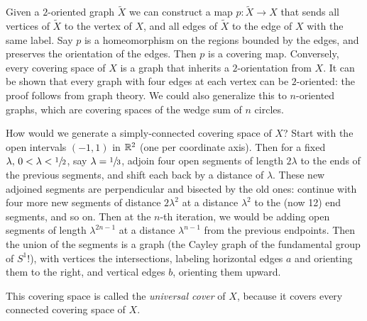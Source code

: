 Given a $2$-oriented graph $\widetilde X$ we can construct a map $p \colon \widetilde X \to X$ that sends all vertices of $\widetilde X$ to the vertex of $X$, and all edges of $\widetilde X$ to the edge of $X$ with the same label. Say $p$ is a homeomorphism on the regions bounded by the edges, and preserves the orientation of the edges. Then $p$ is a covering map. Conversely, every covering space of $X$ is a graph that inherits a $2$-orientation from $X$. It can be shown that every graph with four edges at each vertex can be $2$-oriented: the proof follows from graph theory. We could also generalize this to $n$-oriented graphs, which are covering spaces of the wedge sum of $n$ circles.

How would we generate a simply-connected covering space of $X$? Start with the open intervals $(-1,1)$ in $\mathbb{R}^2$ (one per coordinate axis). Then for a fixed $\lambda,\,0<\lambda < \sfrac{1}{2}$, say $\lambda =\sfrac{1}{3}$, adjoin four open segments of length $2\lambda$ to the ends of the previous segments, and shift each back by a distance of $\lambda$. These new adjoined segments are perpendicular and bisected by the old ones: continue with four more new segments of distance $2\lambda^2$ at a distance $\lambda^2$ to the (now 12) end segments, and so on. Then at the $n$-th iteration, we would be adding open segments of length $\lambda^{2n-1}$ at a distance $\lambda^{n-1}$ from the previous endpoints. Then the union of the segments is a graph (the Cayley graph of the fundamental group of $S^{1} $!), with vertices the intersections, labeling horizontal edges $a$ and orienting them to the right, and vertical edges $b$, orienting them upward.

This covering space is called the \emph{universal cover} of $X$, because it covers every connected covering space of $X$.
\orbreak
